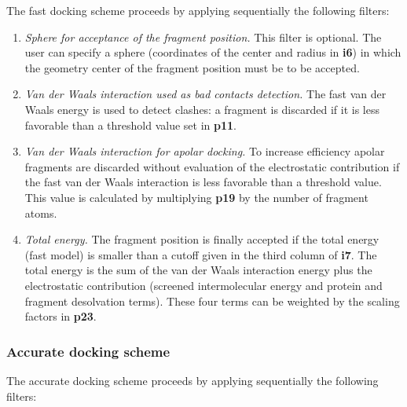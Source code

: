 \documentclass[a4paper,12pt,titlepage]{article}
\begin{document}
The fast docking scheme proceeds by applying sequentially the following filters:

\begin{enumerate}

\item {\it Sphere for acceptance of the fragment position.}
This filter is optional. The user can specify a sphere (coordinates of the center and radius in 
{\bf i6}) in which the geometry center of the fragment position must be to be accepted.

\item {\it Van der Waals interaction used as bad contacts detection.}
The fast van der Waals energy is used to detect clashes: 
a fragment is discarded if it is less favorable than a threshold value set in {\bf p11}.

\item {\it Van der Waals interaction for apolar docking.}
To increase efficiency apolar fragments are discarded without evaluation of the electrostatic 
contribution if the fast van der Waals interaction is less favorable than a threshold value. This value is 
calculated by multiplying {\bf p19} by the number of fragment atoms.

\item {\it Total energy.}
The fragment position is finally accepted if the total energy (fast model) is smaller than a cutoff 
given in the 
third column of {\bf i7}. The total energy is the sum of the van der Waals interaction energy plus 
the electrostatic contribution (screened intermolecular energy and protein and fragment desolvation 
terms). These four terms can be weighted by the scaling factors in {\bf p23}.

\end{enumerate}

\subsubsection{Accurate docking scheme}
\label{sssec:accurdock}

The accurate docking scheme proceeds by applying sequentially the following filters:
\end{document}
